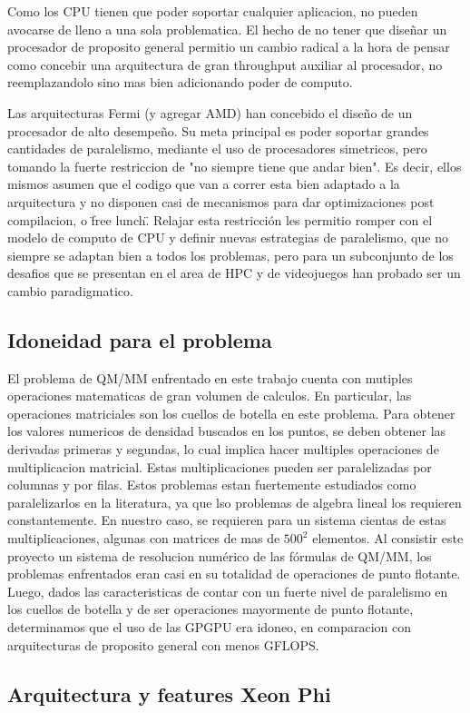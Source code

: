Como los CPU tienen que poder soportar cualquier aplicacion, no pueden avocarse de lleno a una sola
problematica. El hecho de no tener que dise\~nar un procesador de proposito general permitio un cambio radical
a la hora de pensar como concebir una arquitectura de gran throughput auxiliar al procesador, no reemplazandolo
sino mas bien adicionando poder de computo.

Las arquitecturas Fermi (y agregar AMD) han concebido el dise\~no de un procesador de alto desempe\~no.
Su meta principal es poder soportar grandes cantidades de paralelismo, mediante el uso de procesadores
simetricos, pero tomando la fuerte restriccion de "no siempre tiene que andar bien". Es decir, ellos
mismos asumen que el codigo que van a correr esta bien adaptado a la arquitectura y no disponen
casi de mecanismos para dar optimizaciones post compilacion, o \"free lunch\". Relajar esta restricci\'on
les permitio romper con el modelo de computo de CPU y definir nuevas estrategias de paralelismo,
que no siempre se adaptan bien a todos los problemas, pero para un subconjunto de los desafios que se
presentan en el area de HPC y de videojuegos han probado ser un cambio paradigmatico.

\subsection{Idoneidad para el problema}
El problema de QM/MM enfrentado en este trabajo cuenta con mutiples operaciones matematicas de gran
volumen de calculos. En particular, las operaciones matriciales son los cuellos de botella en este
problema.
Para obtener los valores numericos de densidad buscados en los puntos, se deben obtener las derivadas primeras
y segundas, lo cual implica hacer multiples operaciones de multiplicacion matricial. Estas multiplicaciones
pueden ser paralelizadas por columnas y por filas. Estos problemas estan fuertemente estudiados como paralelizarlos
en la literatura, ya que lso problemas de algebra lineal los requieren constantemente.
En nuestro caso, se requieren para un sistema cientas de estas multiplicaciones, algunas con matrices de mas de
$500^2$ elementos. Al consistir este proyecto un sistema de resolucion num\'erico de las f\'ormulas de QM/MM,
los problemas enfrentados eran casi en su totalidad de operaciones de punto flotante. Luego, dados las
caracteristicas de contar con un fuerte nivel de paralelismo en los cuellos de botella y de ser operaciones
mayormente de punto flotante, determinamos que el uso de las GPGPU era idoneo, en comparacion con arquitecturas
de proposito general con menos GFLOPS.

\subsection{Arquitectura y features Xeon Phi}


